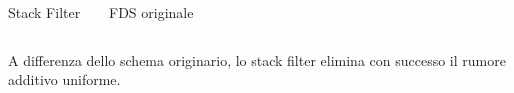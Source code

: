 \documentclass{beamer}
\begin{document}
\begin{frame}
{\begin{columns}
  
    \begin{center}     
Stack Filter
\vspace*{-0.5em}
    \begin{figure}
    \end{figure}
    \end{center}

    \begin{center}
FDS originale
\vspace*{-0.5em}
    \begin{figure}
    \end{figure}
    \end{center}

  \end{columns}
  \begin{block}{}
    A differenza dello schema originario, lo stack filter elimina con successo il rumore additivo uniforme.
  \end{block}
}

\end{frame}
\end{document}
